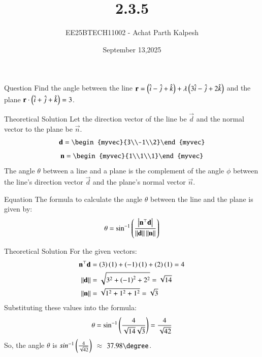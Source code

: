 \documentclass{beamer}
\title %
{2.3.5}
\date{September 13,2025}
\author %
{EE25BTECH11002 - Achat Parth Kalpesh}
\begin{document}
\frame{\titlepage}

\begin{frame}{Question}
Find the angle between the line $\mathbf{r} = \left(\hat{i} - \hat{j} + \hat{k}\right) + \lambda\left(3\hat{i} - \hat{j} + 2\hat{k}\right)$ and the plane $\mathbf{r} \cdot \left(\hat{i} + \hat{j} + \hat{k}\right) = 3$.
\end{frame}

\begin{frame}{Theoretical Solution}
Let the direction vector of the line be $\vec{d}$ and the normal vector to the plane be $\vec{n}$.
\begin{align}
    \vec{d} = \begin{myvec}{3\\-1\\2}\end{myvec}   
    \end{align}
    \begin{align}
    \vec{n} = \begin{myvec}{1\\1\\1}\end{myvec}
\end{align}
The angle $\theta$ between a line and a plane is the complement of the angle $\phi$ between the line's direction vector $\vec{d}$ and the plane's normal vector $\vec{n}$.
\end{frame}

\begin{frame}{Equation}
The formula to calculate the angle $\theta$ between the line and the plane is given by:
\begin{align}
\theta = \sin^{-1}\left(\frac{\left\vert\mathbf{n}^\top\mathbf{d}\right\vert}{\left\lVert\mathbf{d}\right\rVert \left\lVert\mathbf{n}\right\rVert}\right)
\end{align}

\end{frame}

\begin{frame}{Theoretical Solution}
For the given vectors:
\begin{align}
    \mathbf{n}^\top\mathbf{d} &= \left(3\right)\left(1\right) + \left(-1\right)\left(1\right) + \left(2\right)\left(1\right) = 4 \\
    \left\lVert\mathbf{d}\right\rVert &= \sqrt{3^2 + \left(-1\right)^2 + 2^2} = \sqrt{14} \\
    \left\lVert\mathbf{n}\right\rVert &= \sqrt{1^2 + 1^2 + 1^2} = \sqrt{3}
\end{align}
Substituting these values into the formula:
\begin{align}
    \theta = \sin^{-1}\left(\frac{4}{\sqrt{14}\sqrt{3}}\right) = \frac{4}{\sqrt{42}}
\end{align}
So, the angle $\theta$ is $sin^{-1}\left(\frac{4}{\sqrt{42}}\right)$ $\approx$ $37.98\degree$.
\end{frame}
\end{document}
